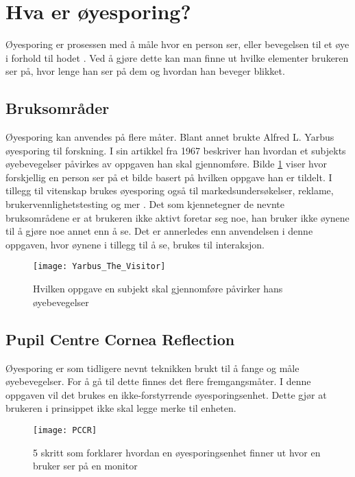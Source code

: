 \section{Hva er øyesporing?}

Øyesporing er prosessen med å måle hvor en person ser, eller bevegelsen til et øye i forhold til hodet \cite{Eyet4:online}. Ved å gjøre dette kan man finne ut hvilke elementer brukeren ser på, hvor lenge han ser på dem og hvordan han beveger blikket. 


\subsection{Bruksområder}

Øyesporing kan anvendes på flere måter. Blant annet brukte Alfred L. Yarbus øyesporing til forskning. I sin artikkel fra 1967 \cite{wexle4:online} beskriver han hvordan et subjekts øyebevegelser påvirkes av oppgaven han skal gjennomføre. Bilde \ref{fig:yarbus} viser hvor forskjellig en person ser på et bilde basert på hvilken oppgave han er tildelt. I tillegg til vitenskap brukes øyesporing også til markedsundersøkelser, reklame, brukervennlighetstesting og mer \cite{Case2:online}. Det som kjennetegner de nevnte bruksområdene er at brukeren ikke aktivt foretar seg noe, han bruker ikke øynene til å gjøre noe annet enn å se. Det er annerledes enn anvendelsen i denne oppgaven, hvor øynene i tillegg til å se, brukes til interaksjon.

\begin{figure}[ht!]
\centering
\texttt{[image: Yarbus\_The\_Visitor]}
\caption{Hvilken oppgave en subjekt skal gjennomføre påvirker hans øyebevegelser \cite{Yarbu2:online}}
\label{fig:yarbus}
\end{figure}


\subsection{Pupil Centre Cornea Reflection}

Øyesporing er som tidligere nevnt teknikken brukt til å fange og måle øyebevegelser. For å gå til dette finnes det flere fremgangsmåter. I denne oppgaven vil det brukes en ikke-forstyrrende øyesporingsenhet. Dette gjør at brukeren i prinsippet ikke skal legge merke til enheten. 

\begin{figure}[ht!]
\centering
\texttt{[image: PCCR]}
\caption{5 skritt som forklarer hvordan en øyesporingsenhet finner ut hvor en bruker ser på en monitor \cite{Under3:online}}
\label{fig:PCCR}
\end{figure}

